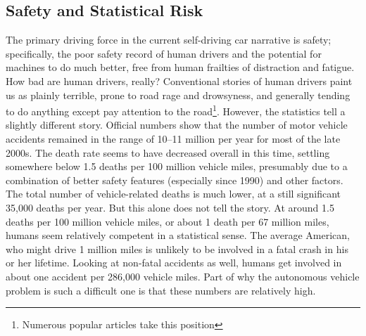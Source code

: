 \subsection{Safety and Statistical Risk}

The primary driving force in the current self-driving car
narrative is safety; specifically, the poor safety record of human
drivers and the potential for machines to do much better, free from
human frailties of distraction and fatigue. How bad are human
drivers, really? Conventional stories of human drivers paint us as
plainly terrible, prone to road rage and drowsyness, and generally tending
to do anything except pay attention to the road\footnote{Numerous popular
  articles take this position\cite{???}}. However, the statistics tell
a slightly different story. Official numbers show that the number of
motor vehicle accidents remained in the range of 10--11 million
per year for most of the late 2000s. The death rate seems to have
decreased overall in this time, settling somewhere below 1.5 deaths
per 100 million vehicle miles, presumably due to a combination of
better safety features (especially since 1990) and other
factors.\cite{???} The total number of vehicle-related deaths is much
lower, at a still significant 35,000 deaths per year. But this alone
does not tell the story. At around 1.5 deaths per 100 million vehicle
miles, or about 1 death per 67 million miles, humans seem relatively
competent in a statistical sense. The average American, who might
drive 1 million miles\cite{???} is unlikely to be
involved in a fatal crash in his or her lifetime. Looking at non-fatal
accidents as well, humans get involved in about one accident per
286,000 vehicle miles. Part of why the autonomous vehicle problem is
such a difficult one is that these numbers are relatively high.

